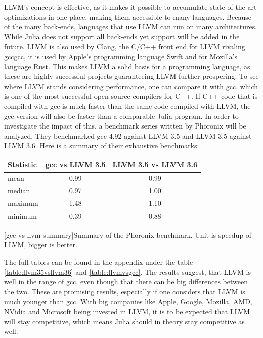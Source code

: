 \ac{LLVM}'s concept is effective, as it makes it possible to accumulate state of the art optimizations in one place, making them accessible to many languages. Because of the many back-ends, languages that use \ac{LLVM} can run on many architectures. While Julia does not support all back-ends yet support will be added in the future.
\ac{LLVM} is also used by Clang\cite{Clang}, the C/C++ front end for \ac{LLVM} rivaling \ac{gcc}\ac{gcc}, it is used by Apple's programming language Swift\cite{SWIFT} and for Mozilla's language Rust\cite{Rust}.
This makes \ac{LLVM} a solid basis for a programming language, as these are highly successful projects guaranteeing \ac{LLVM} further prospering.
To see where \ac{LLVM} stands considering performance, one can compare it with \ac{gcc}, which is one of the most successful open source compilers for C++.
If C++ code that is compiled with \ac{gcc} is much faster than the same code compiled with \ac{LLVM}, the \ac{gcc} version will also be faster than a comparable Julia program.
In order to investigate the impact of this, a benchmark series written by Phoronix will be analyzed.
They benchmarked \ac{gcc} 4.92 against \ac{LLVM} 3.5 and \ac{LLVM} 3.5 against \ac{LLVM} 3.6.
Here is a summary of their exhaustive benchmarks:
\begin{table}[ht]
  \centering
  \begin{tabular}{l|c|c}
    \hline
    \textbf{Statistic} & \textbf{\ac{gcc} vs \ac{LLVM} 3.5} & \textbf{\ac{LLVM} 3.5 vs \ac{LLVM} 3.6} \\
    \hline
    mean & 0.99 & 0.99 \\
    median & 0.97 & 1.00 \\
    maximum & 1.48 & 1.10 \\
    minimum & 0.39 & 0.88 \\
    \hline
  \end{tabular}
    [gcc vs llvm summary]{Summary of the Phoronix benchmark. Unit is speedup of \ac{LLVM}, bigger is better. \cite{LLVM35vsLLVM36}\cite{LLVMvsGCC}\cite{Phoronix}}
    \label{table:gccvsllvm}
\end{table}

The full tables can be found in the appendix under the table \ref{table:llvm35vsllvm36} and \ref{table:llvmvsgcc}.
The results suggest, that \ac{LLVM} is well in the range of \ac{gcc}, even though that there can be big differences between the two.
These are promising results, especially if one considers that \ac{LLVM} is much younger than \ac{gcc}. 
With big companies like Apple\cite{GoogleAppleLLVM}, Google\cite{GoogleAppleLLVM}, Mozilla\cite{Rust}, AMD\cite{LLVMAMD}, NVidia\cite{LLVMNvidia} and Microsoft\cite{MicrosoftLLVM} being invested in LLVM, it is to be expected that \ac{LLVM} will stay competitive, which means Julia should in theory stay competitive as well.



